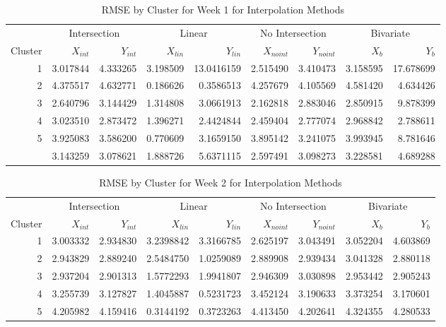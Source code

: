 \documentclass[12pt]{article}
\begin{document}
\begin{table}

\caption{\label{tab:results-clust1-actual}RMSE by Cluster for Week 1 for Interpolation Methods}
\centering
\begin{tabular}[t]{rrrrrrrrr}
\toprule
\multicolumn{1}{c}{ } & \multicolumn{2}{c}{Intersection} & \multicolumn{2}{c}{Linear} & \multicolumn{2}{c}{No Intersection} & \multicolumn{2}{c}{Bivariate} \\
\cmidrule(l{3pt}r{3pt}){2-3} \cmidrule(l{3pt}r{3pt}){4-5} \cmidrule(l{3pt}r{3pt}){6-7} \cmidrule(l{3pt}r{3pt}){8-9}
Cluster & $X_{int}$ & $Y_{int}$ & $X_{lin}$ & $Y_{lin}$ & $X_{noint}$ & $Y_{noint}$ & $X_b$ & $Y_b$\\
\midrule
1 & 3.017844 & 4.333265 & 3.198509 & 13.0416159 & 2.515490 & 3.410473 & 3.158595 & 17.678699\\
2 & 4.375517 & 4.632771 & 0.186626 & 0.3586513 & 4.257679 & 4.105569 & 4.581420 & 4.634426\\
3 & 2.640796 & 3.144429 & 1.314808 & 3.0661913 & 2.162818 & 2.883046 & 2.850915 & 9.878399\\
4 & 3.023510 & 2.873472 & 1.396271 & 2.4424844 & 2.459404 & 2.777074 & 2.968842 & 2.788611\\
5 & 3.925083 & 3.586200 & 0.770609 & 3.1659150 & 3.895142 & 3.241075 & 3.993945 & 8.781646\\
\addlinespace
6 & 3.143259 & 3.078621 & 1.888726 & 5.6371115 & 2.597491 & 3.098273 & 3.228581 & 4.689288\\
\bottomrule
\end{tabular}
\end{table}

\begin{table}

\caption{\label{tab:results-clust2-actual}RMSE by Cluster for Week 2 for Interpolation Methods}
\centering
\begin{tabular}[t]{rrrrrrrrr}
\toprule
\multicolumn{1}{c}{ } & \multicolumn{2}{c}{Intersection} & \multicolumn{2}{c}{Linear} & \multicolumn{2}{c}{No Intersection} & \multicolumn{2}{c}{Bivariate} \\
\cmidrule(l{3pt}r{3pt}){2-3} \cmidrule(l{3pt}r{3pt}){4-5} \cmidrule(l{3pt}r{3pt}){6-7} \cmidrule(l{3pt}r{3pt}){8-9}
Cluster & $X_{int}$ & $Y_{int}$ & $X_{lin}$ & $Y_{lin}$ & $X_{noint}$ & $Y_{noint}$ & $X_b$ & $Y_b$\\
\midrule
1 & 3.003332 & 2.934830 & 3.2398842 & 3.3166785 & 2.625197 & 3.043491 & 3.052204 & 4.603869\\
2 & 2.943829 & 2.889240 & 2.5484750 & 1.0259089 & 2.889908 & 2.939434 & 3.041328 & 2.880118\\
3 & 2.937204 & 2.901313 & 1.5772293 & 1.9941807 & 2.946309 & 3.030898 & 2.953442 & 2.905243\\
4 & 3.255739 & 3.127827 & 1.4045887 & 0.5231723 & 3.452124 & 3.190633 & 3.373254 & 3.170601\\
5 & 4.205982 & 4.159416 & 0.3144192 & 0.3723263 & 4.413450 & 4.202641 & 4.324355 & 4.280533\\
\bottomrule
\end{tabular}
\end{table}
\end{document}
